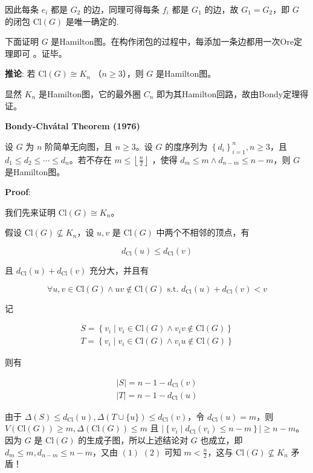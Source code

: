 \documentclass{article}
\begin{document}
因此每条 \( e_{i} \) 都是 \( G_{2} \) 的边，同理可得每条 \( f_{i} \) 都是 \( G_{1} \) 的边，故 \( G_{1} = G_{2} \)，即 \( G \) 的闭包 \(\mathrm{Cl}(G)\) 是唯一确定的.

下面证明 \( G \) 是Hamilton图。在构作闭包的过程中，每添加一条边都用一次Ore定理即可 。证毕。




\textbf{推论}: 若 \( \mathrm{Cl}(G) \cong K_{n} \) （\( n \geq 3 \)），则 \( G \) 是Hamilton图。

显然 \( K_{n} \) 是Hamilton图，它的最外圈 \( C_{n} \) 即为其Hamilton回路，故由Bondy定理得证。

\textbf{Bondy-Chvátal Theorem (1976)}

设 \( G \) 为 \( n \) 阶简单无向图，且 \( n \geq 3 \)。设 \( G \) 的度序列为 \( \left\{d_{i}\right\}_{i=1}^{n}, n \geq 3 \)，且 \( d_{1} \leq d_{2} \leq \cdots \leq d_{n} \)。若不存在 \( m \leq\left\lfloor\frac{n}{2}\right\rfloor \) ，使得 \( d_{m} \leq m \wedge d_{n-m} \leq n-m \)，则 \( G \) 是Hamilton图。

\textbf{Proof}:

我们先来证明 \( \mathrm{Cl}(G) \cong K_{n} \)。

假设 \( \mathrm{Cl}(G) \nsubseteq K_{n} \)，设 \( u, v \) 是 \( \mathrm{Cl}(G) \) 中两个不相邻的顶点，有

\[ d_{\mathrm{Cl}}(u) \leq d_{\mathrm{Cl}}(v) \]

且 \( d_{\mathrm{Cl}}(u)+d_{\mathrm{Cl}}(v) \) 充分大，并且有

\[ \forall u, v \in \mathrm{Cl}(G) \wedge u v \notin \mathrm{Cl}(G) \text { s.t. } d_{\mathrm{Cl}}(u)+d_{\mathrm{Cl}}(v)<v \]

记

\[
\begin{array}{l}
S=\left\{v_{i} \mid v_{i} \in \mathrm{Cl}(G) \wedge v_{i} v \notin \mathrm{Cl}(G)\right\} \\
T=\left\{v_{i} \mid v_{i} \in \mathrm{Cl}(G) \wedge v_{i} u \notin \mathrm{Cl}(G)\right\}
\end{array}
\]

则有

\[
\begin{array}{l}
|S|=n-1-d_{\mathrm{Cl}}(v) \\
|T|=n-1-d_{\mathrm{Cl}}(u)
\end{array}
\]

由于 \( \Delta(S) \leq d_{\mathrm{Cl}}(u), \Delta(T \cup\{u\}) \leq d_{\mathrm{Cl}}(v) \)，令 \( d_{\mathrm{Cl}}(u)=m \)，则 \( V(\mathrm{Cl}(G)) \geq m, \Delta(\mathrm{Cl}(G)) \leq m \) 且 \( \left|\left\{v_{i} \mid d_{\mathrm{Cl}}\left(v_{i}\right) \leq n-m\right\}\right| \geq n-m \)。因为 \( G \) 是 \( \mathrm{Cl}(G) \) 的生成子图，所以上述结论对 \( G \) 也成立，即
\( d_{m} \leq m, d_{n-m} \leq n-m \)，又由 \( (1) \) \( (2) \) 可知 \( m<\frac{n}{2} \)，这与 \( \mathrm{Cl}(G) \nsubseteq K_{n} \) 矛盾！
\end{document}
